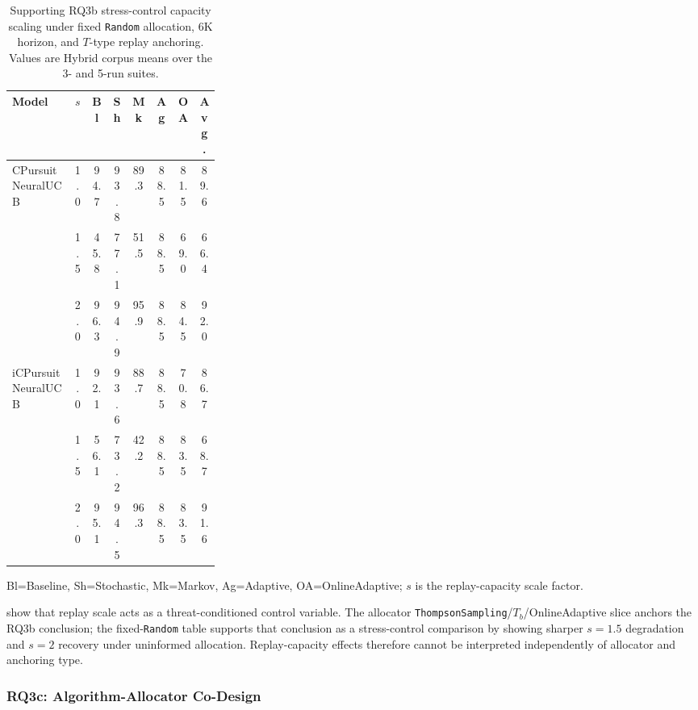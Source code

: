 \begin{table}[ht!]
\footnotesize
\centering
\setlength{\tabcolsep}{3pt}
\caption{Supporting RQ3b stress-control capacity scaling under fixed \texttt{Random} allocation, 6K horizon, and $T$-type replay anchoring. Values are Hybrid corpus means over the 3- and 5-run suites.}
\label{tab:rq3b_master_capacity_scaling}
\begin{tabular}{p{0.30\linewidth} c c c c c c c}
\toprule
\textbf{Model} & \textbf{$s$} & \textbf{Bl} & \textbf{Sh} & \textbf{Mk} & \textbf{Ag} & \textbf{OA} & \textbf{Avg.} \\
\midrule
CPursuitNeuralUCB & 1.0 & 94.7 & 93.8 & 89.3 & 88.5 & 81.5 & 89.6 \\
                  & 1.5 & 45.8 & 77.1 & 51.5 & 88.5 & 69.0 & 66.4 \\
                  & 2.0 & 96.3 & 94.9 & 95.9 & 88.5 & 84.5 & 92.0 \\
\midrule
iCPursuitNeuralUCB & 1.0 & 92.1 & 93.6 & 88.7 & 88.5 & 70.8 & 86.7 \\
                   & 1.5 & 56.1 & 73.2 & 42.2 & 88.5 & 83.5 & 68.7 \\
                   & 2.0 & 95.1 & 94.5 & 96.3 & 88.5 & 83.5 & 91.6 \\
\bottomrule
\end{tabular}
{\footnotesize Bl=Baseline, Sh=Stochastic, Mk=Markov, Ag=Adaptive, OA=OnlineAdaptive; $s$ is the replay-capacity scale factor.}
\end{table}

 show that replay scale acts as a threat-conditioned control variable. The allocator \texttt{ThompsonSampling}/$T_b$/OnlineAdaptive slice anchors the RQ3b conclusion; the fixed-\texttt{Random} table supports that conclusion as a stress-control comparison by showing sharper $s=1.5$ degradation and $s=2$ recovery under uninformed allocation. Replay-capacity effects therefore cannot be interpreted independently of allocator and anchoring type.

\subsubsection{RQ3c: Algorithm-Allocator Co-Design}
\label{subsec:rq3c_answer}


